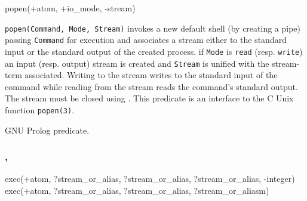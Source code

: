 \begin{TemplatesOneCol}
popen(+atom, +io\_mode, -stream)

\end{TemplatesOneCol}

\Description

\texttt{popen(Command, Mode, Stream)} invokes a new default shell (by
creating a pipe) passing \texttt{Command} for execution and associates a
stream either to the standard input or the standard output of the created
process. if \texttt{Mode} is \texttt{read} (resp. \texttt{write}) an input
(resp. output) stream is created and \texttt{Stream} is unified with the
stream-term associated. Writing to the stream writes to the standard input
of the command while reading from the stream reads the command's standard
output. The stream must be closed using  .
This predicate is an interface to the C Unix function \texttt{popen(3)}.

\begin{PlErrors}








\end{PlErrors}

\Portability

GNU Prolog predicate.

\subsubsection{,
               }

\begin{TemplatesOneCol}
exec(+atom, ?stream\_or\_alias, ?stream\_or\_alias, ?stream\_or\_alias, -integer)\\
exec(+atom, ?stream\_or\_alias, ?stream\_or\_alias, ?stream\_or\_aliasm)

\end{TemplatesOneCol}

